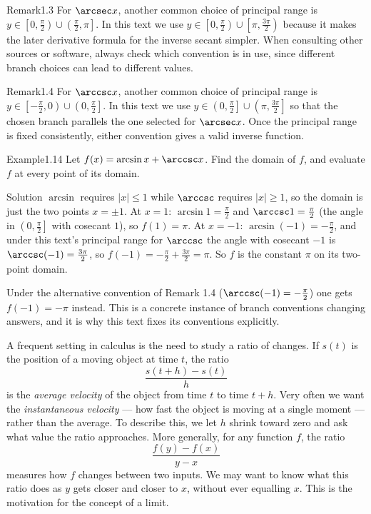 \documentclass[a4paper,12pt,oneside]{memoir}
\begin{document}
\begin{envremark}{Remark}{1.3}{}
For \(\arcsec x\), another common choice of principal range is \(y \in \left[0, \tfrac{\pi}{2}\right) \cup \left(\tfrac{\pi}{2}, \pi\right]\). In this text we use \(y \in \left[0, \tfrac{\pi}{2}\right) \cup \left[\pi, \tfrac{3\pi}{2}\right)\) because it makes the later derivative formula for the inverse secant simpler. When consulting other sources or software, always check which convention is in use, since different branch choices can lead to different values.
\end{envremark}
\begin{envremark}{Remark}{1.4}{}
For \(\arccsc x\), another common choice of principal range is \(y \in \left[-\tfrac{\pi}{2}, 0\right) \cup \left(0, \tfrac{\pi}{2}\right]\). In this text we use \(y \in \left(0, \tfrac{\pi}{2}\right] \cup \left(\pi, \tfrac{3\pi}{2}\right]\) so that the chosen branch parallels the one selected for \(\arcsec x\). Once the principal range is fixed consistently, either convention gives a valid inverse function.
\end{envremark}
\begin{workedexample}
\begin{envexample}{Example}{1.14}{}
Let \(f(x) = \arcsin x + \arccsc x\). Find the domain of \(f\), and evaluate \(f\) at every point of its domain.
\end{envexample}
\begin{envsolution}{Solution}{}{}
\(\arcsin\) requires \(|x| \le 1\) while \(\arccsc\) requires \(|x| \ge 1\), so the domain is just the two points \(x = \pm 1\). At \(x = 1\): \(\arcsin 1 = \tfrac{\pi}{2}\) and \(\arccsc 1 = \tfrac{\pi}{2}\) (the angle in \(\left(0, \tfrac{\pi}{2}\right]\) with cosecant \(1\)), so \(f(1) = \pi\). At \(x = -1\): \(\arcsin(-1) = -\tfrac{\pi}{2}\), and under this text’s principal range for \(\arccsc\) the angle with cosecant \(-1\) is \(\arccsc(-1) = \tfrac{3\pi}{2}\), so \(f(-1) = -\tfrac{\pi}{2} + \tfrac{3\pi}{2} = \pi\). So \(f\) is the constant \(\pi\) on its two-point domain.

Under the alternative convention of Remark 1.4 (\(\arccsc(-1) = -\tfrac{\pi}{2}\)) one gets \(f(-1) = -\pi\) instead. This is a concrete instance of branch conventions changing answers, and it is why this text fixes its conventions explicitly.
\end{envsolution}
\end{workedexample}

A frequent setting in calculus is the need to study a ratio of changes. If \(s(t)\) is the position of a moving object at time \(t\), the ratio \[ \frac{s(t + h) - s(t)}{h} \] is the \emph{average velocity} of the object from time \(t\) to time \(t + h\). Very often we want the \emph{instantaneous velocity} — how fast the object is moving at a single moment — rather than the average. To describe this, we let \(h\) shrink toward zero and ask what value the ratio approaches. More generally, for any function \(f\), the ratio \[ \frac{f(y) - f(x)}{y - x} \] measures how \(f\) changes between two inputs. We may want to know what this ratio does as \(y\) gets closer and closer to \(x\), without ever equalling \(x\). This is the motivation for the concept of a limit.
\end{document}
